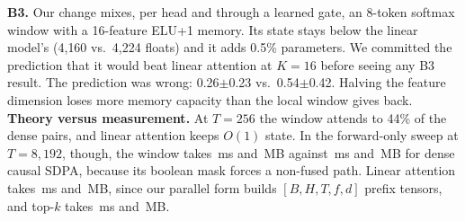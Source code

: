 \documentclass{article}
\begin{document}
\textbf{B3.} Our change mixes, per head and through a learned gate, an 8-token softmax window with a 16-feature ELU+1 memory. Its state stays below the linear model's (4{,}160 vs.\ 4{,}224 floats) and it adds 0.5\% parameters. We committed the prediction that it would beat linear attention at $K{=}16$ before seeing any B3 result. The prediction was wrong: 0.26$\pm$0.23 vs.\ 0.54$\pm$0.42. Halving the feature dimension loses more memory capacity than the local window gives back.
\textbf{Theory versus measurement.} At $T{=}256$ the window attends to 44\% of the dense pairs, and linear attention keeps $O(1)$ state. In the forward-only sweep at $T{=}8{,}192$, though, the window takes \SwWindowMs\,ms and \SwWindowMB\,MB against \SwDenseMs\,ms and \SwDenseMB\,MB for dense causal SDPA, because its boolean mask forces a non-fused path. Linear attention takes \SwLinearMs\,ms and \SwLinearMB\,MB, since our parallel form builds $[B,H,T,f,d]$ prefix tensors, and top-$k$ takes \SwTopkMs\,ms and \SwTopkMB\,MB.
\end{document}
